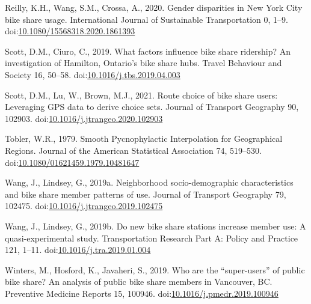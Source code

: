\documentclass[]{elsarticle} %
\begin{document}
\leavevmode\hypertarget{ref-reillyGenderDisparitiesNew2020}{}%
Reilly, K.H., Wang, S.M., Crossa, A., 2020. Gender disparities in New
York City bike share usage. International Journal of Sustainable
Transportation 0, 1--9.
doi:\href{https://doi.org/10.1080/15568318.2020.1861393}{10.1080/15568318.2020.1861393}

\leavevmode\hypertarget{ref-scottWhatFactorsInfluence2019}{}%
Scott, D.M., Ciuro, C., 2019. What factors influence bike share
ridership? An investigation of Hamilton, Ontario's bike share hubs.
Travel Behaviour and Society 16, 50--58.
doi:\href{https://doi.org/10.1016/j.tbs.2019.04.003}{10.1016/j.tbs.2019.04.003}

\leavevmode\hypertarget{ref-scottRouteChoiceBike2021}{}%
Scott, D.M., Lu, W., Brown, M.J., 2021. Route choice of bike share
users: Leveraging GPS data to derive choice sets. Journal of Transport
Geography 90, 102903.
doi:\href{https://doi.org/10.1016/j.jtrangeo.2020.102903}{10.1016/j.jtrangeo.2020.102903}

\leavevmode\hypertarget{ref-toblerSmoothPycnophylacticInterpolation1979}{}%
Tobler, W.R., 1979. Smooth Pycnophylactic Interpolation for Geographical
Regions. Journal of the American Statistical Association 74, 519--530.
doi:\href{https://doi.org/10.1080/01621459.1979.10481647}{10.1080/01621459.1979.10481647}

\leavevmode\hypertarget{ref-wangNeighborhoodSociodemographicCharacteristics2019}{}%
Wang, J., Lindsey, G., 2019a. Neighborhood socio-demographic
characteristics and bike share member patterns of use. Journal of
Transport Geography 79, 102475.
doi:\href{https://doi.org/10.1016/j.jtrangeo.2019.102475}{10.1016/j.jtrangeo.2019.102475}

\leavevmode\hypertarget{ref-wangNewBikeShare2019}{}%
Wang, J., Lindsey, G., 2019b. Do new bike share stations increase member
use: A quasi-experimental study. Transportation Research Part A: Policy
and Practice 121, 1--11.
doi:\href{https://doi.org/10.1016/j.tra.2019.01.004}{10.1016/j.tra.2019.01.004}

\leavevmode\hypertarget{ref-wintersWhoAreSuperusers2019}{}%
Winters, M., Hosford, K., Javaheri, S., 2019. Who are the
``super-users'' of public bike share? An analysis of public bike share
members in Vancouver, BC. Preventive Medicine Reports 15, 100946.
doi:\href{https://doi.org/10.1016/j.pmedr.2019.100946}{10.1016/j.pmedr.2019.100946}
\end{document}
